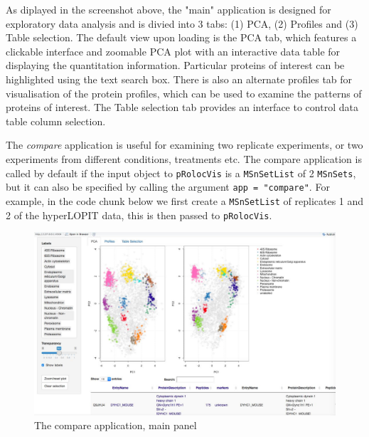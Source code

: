As diplayed in the screenshot above, the "main" application is
designed for exploratory data analysis and is divied into 3 tabs: (1)
PCA, (2) Profiles and (3) Table selection. The default view upon
loading is the PCA tab, which features a clickable interface and
zoomable PCA plot with an interactive data table for displaying the
quantitation information. Particular proteins of interest can be
highlighted using the text search box. There is also an alternate
profiles tab for visualisation of the protein profiles, which can be
used to examine the patterns of proteins of interest. The Table
selection tab provides an interface to control data table column
selection. 

The \textit{compare} application is useful for examining two replicate
experiments, or two experiments from different conditions, treatments
etc. The compare application is called by default if the input object
to \texttt{pRolocVis} is a \texttt{MSnSetList} of 2 \texttt{MSnSets},
but it can also be specified by calling the argument \texttt{app =
  "compare"}. For example, in the code chunk below we first create a
\texttt{MSnSetList} of replicates 1 and 2 of the hyperLOPIT data, this
is then passed to \texttt{pRolocVis}.

\begin{knitrout}
\color{fgcolor}\begin{kframe}
\begin{alltt}
 \hlkwb{<-} \hlstd{(}
  \hlstd{=} \hlstd{)}
\end{alltt}
\end{kframe}
\end{knitrout}

\begin{figure}[!ht]
  \centering
  \includegraphics[width=\textwidth]{./Figures/SS_Compare1.jpg}
  \caption{The compare application, main panel}
  \label{fig:compare}
\end{figure}

